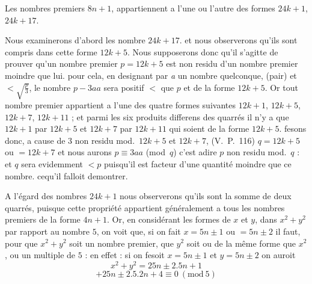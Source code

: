 \documentclass[11pt,a4paper]{article}
\begin{document}
Les nombres premiers $8n+1$, appartiennent a l'une ou l'autre des formes
$24k+1$, $24k+17$.

Nous examinerons d'abord les nombre $24k+17$. et nous observerons qu'ils
sont compris dans cette forme $12k+5$. Nous supposerons donc qu'il
s'agitte de prouver qu'un nombre premier $p=12k+5$ est non residu d'un
nombre premier moindre que lui. pour cela, en designant par \emph{a} un
nombre quelconque, (pair) et $<\sqrt{\frac{p}{3}}$, le nombre $p-3aa$ sera positif
$<$ que $p$ et de la forme $12k+5$. Or tout nombre premier appartient
a l'une des quatre formes suivantes $12k+1$, $12k+5$, $12k+7$, $12k+11$ ;
et parmi les six produits differens des quarrés il n'y a que $12k+1$ par
$12k+5$ et $12k+7$ par $12k+11$ qui soient de la forme $12k+5$.
fesons donc, a cause de $3$ non residu mod.~$12k+5$ et $12k+7$, (V.~P.~116)
$q=12k+5$ ou $=12k+7$ et nous aurons $p\equiv3aa$ (mod~$q$) c'est adire
$p$ non residu mod.~$q$ : et $q$ sera evidemment $<p$ puisqu'il est
facteur d'une quantité moindre que ce nombre. cequ'il falloit demontrer.

A l'égard des nombres $24k+1$ nous observerons qu'ils sont la
somme de deux quarrés, puisque cette propriété appartient généralement
a tous les nombres premiers de la forme $4n+1$. Or, en considérant
les formes de $x$ et $y$, dans $x^{2}+y^{2}$ par rapport au nombre $5$,
on voit que, si on fait $x=5n\pm1$ ou $=5n\pm2$ il faut, pour
que $x^{2}+y^{2}$ soit un nombre premier, que $y^{2}$ soit ou de la même
forme que $x^{2}$, ou un multiple de $5$ : en effet : si on fesoit
$x=5n\pm1$ et $y=5n\pm2$ on auroit
\[ x^{2}+y^{2}=25n\pm2.5n+1 \]
\[ +25n\pm2.5.2n+4\equiv0\ (\text{mod}\ 5) \]


\end{document}
